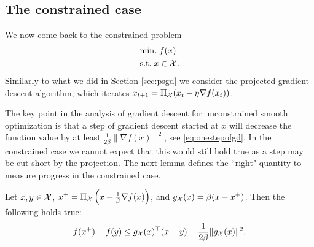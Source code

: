 \subsection*{The constrained case}
We now come back to the constrained problem
\begin{align*}
& \mathrm{min.} \; f(x) \\
& \text{s.t.} \; x \in \mathcal{X} .
\end{align*}
Similarly to what we did in Section \ref{sec:psgd} we consider the projected gradient descent algorithm, which iterates $x_{t+1} = \Pi_{\mathcal{X}}(x_t - \eta \nabla f(x_t))$. 

The key point in the analysis of gradient descent for unconstrained smooth optimization is that a step of gradient descent started at $x$ will decrease the function value by at least $\frac{1}{2\beta} \|\nabla f(x)\|^2$, see \eqref{eq:onestepofgd}. In the constrained case we cannot expect that this would still hold true as a step may be cut short by the projection. The next lemma defines the ``right" quantity to measure progress in the constrained case.

\begin{lemma} \label{lem:smoothconst}
Let $x, y \in \mathcal{X}$, $x^+ = \Pi_{\mathcal{X}}\left(x - \frac{1}{\beta} \nabla f(x)\right)$, and $g_{\mathcal{X}}(x) = \beta(x - x^+)$. Then the following holds true:
$$f(x^+) - f(y) \leq g_{\mathcal{X}}(x)^{\top}(x-y) - \frac{1}{2 \beta} \|g_{\mathcal{X}}(x)\|^2 .$$
\end{lemma}

